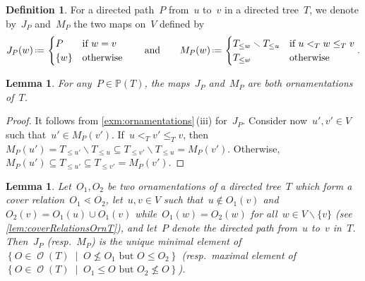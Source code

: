 \documentclass{amsart}
\newtheorem{lemma}[theorem]{Lemma}
\theoremstyle{definition}
\newtheorem{definition}[theorem]{Definition}
\renewcommand{\c}[1]{\mathcal{#1}} %
\newcommand{\set}[2]{\left\{ #1 \;\middle|\; #2 \right\}} %
\newcommand{\ssm}{\smallsetminus} %
\newcommand{\eqdef}{\mbox{\,\raisebox{0.2ex}{\scriptsize\ensuremath{\mathrm:}}\ensuremath{=}\,}} %
\newcommand{\lessin}[2]{#1_{\le#2}} %
\DeclareMathOperator{\Orn}{\c{O}}  %
\newcommand{\PP}{\mathbb P} %
\begin{document}
\begin{definition}
\label{def:irreducibleOrnamentationsT}
For a directed path~$P$ from~$u$ to~$v$ in a directed tree~$T$, we denote by~$J_P$ and~$M_P$ the two maps on~$V$ defined by
\[
J_P(w) \eqdef \begin{cases} P & \text{if } w = v \\ \{w\} & \text{otherwise} \end{cases}
\qquad\text{and}\qquad
M_P(w) \eqdef \begin{cases} \lessin{T}{w} \ssm \lessin{T}{u} & \text{if } u <_T w \le_T v \\ \lessin{T}{w} & \text{otherwise} \end{cases}
.
\]
\end{definition}

\begin{lemma}
For any~$P \in \PP(T)$, the maps~$J_P$ and~$M_P$ are both ornamentations of~$T$.
\end{lemma}

\begin{proof}
It follows from \cref{exm:ornamentations}\,(iii) for~$J_P$.
Consider now~$u', v' \in V$ such that~$u' \in M_P(v')$.
If~$u <_T v' \le_T v$, then~$M_P(u') = \lessin{T}{u'} \ssm \lessin{T}{u} \subseteq \lessin{T}{v'} \ssm \lessin{T}{u} = M_P(v')$.
Otherwise, $M_P(u') \subseteq \lessin{T}{u'} \subseteq \lessin{T}{v'} = M_P(v')$.
\end{proof}

\begin{lemma}
\label{lem:semidistributive}
Let~$O_1, O_2$ be two ornamentations of a directed tree~$T$ which form a cover relation~$O_1 \lessdot O_2$, let~$u,v \in V$ such that~$u \notin O_1(v)$ and $O_2(v) = O_1(u) \cup O_1(v)$ while~$O_1(w) = O_2(w)$ for all~${w \in V \ssm \{v\}}$ (see \cref{lem:coverRelationsOrnT}), and let~$P$ denote the directed path from~$u$ to~$v$ in~$T$.
Then~$J_P$ (resp.~$M_P$) is the unique minimal element of~$\set{O \in \Orn(T)}{O \not\le O_1 \text{ but } O \le O_2}$ (resp.~maximal element of~$\set{O \in \Orn(T)}{O_1 \le O \text{ but } O_2 \not\le O}$).
\end{lemma}
\end{document}
